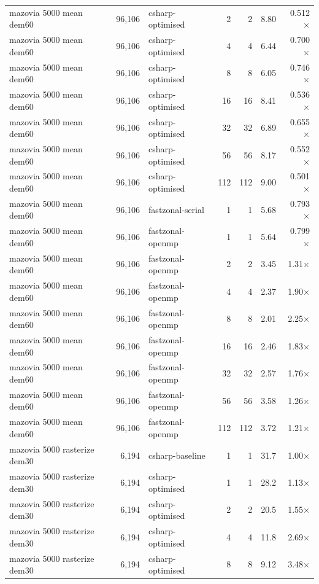 \begin{tabular}{lrlrrrr}
mazovia 5000 mean dem60 & 96,106 & csharp-optimised & 2 & 2 & 8.80 & 0.512$\times$ \\
mazovia 5000 mean dem60 & 96,106 & csharp-optimised & 4 & 4 & 6.44 & 0.700$\times$ \\
mazovia 5000 mean dem60 & 96,106 & csharp-optimised & 8 & 8 & 6.05 & 0.746$\times$ \\
mazovia 5000 mean dem60 & 96,106 & csharp-optimised & 16 & 16 & 8.41 & 0.536$\times$ \\
mazovia 5000 mean dem60 & 96,106 & csharp-optimised & 32 & 32 & 6.89 & 0.655$\times$ \\
mazovia 5000 mean dem60 & 96,106 & csharp-optimised & 56 & 56 & 8.17 & 0.552$\times$ \\
mazovia 5000 mean dem60 & 96,106 & csharp-optimised & 112 & 112 & 9.00 & 0.501$\times$ \\
mazovia 5000 mean dem60 & 96,106 & fastzonal-serial & 1 & 1 & 5.68 & 0.793$\times$ \\
mazovia 5000 mean dem60 & 96,106 & fastzonal-openmp & 1 & 1 & 5.64 & 0.799$\times$ \\
mazovia 5000 mean dem60 & 96,106 & fastzonal-openmp & 2 & 2 & 3.45 & 1.31$\times$ \\
mazovia 5000 mean dem60 & 96,106 & fastzonal-openmp & 4 & 4 & 2.37 & 1.90$\times$ \\
mazovia 5000 mean dem60 & 96,106 & fastzonal-openmp & 8 & 8 & 2.01 & 2.25$\times$ \\
mazovia 5000 mean dem60 & 96,106 & fastzonal-openmp & 16 & 16 & 2.46 & 1.83$\times$ \\
mazovia 5000 mean dem60 & 96,106 & fastzonal-openmp & 32 & 32 & 2.57 & 1.76$\times$ \\
mazovia 5000 mean dem60 & 96,106 & fastzonal-openmp & 56 & 56 & 3.58 & 1.26$\times$ \\
mazovia 5000 mean dem60 & 96,106 & fastzonal-openmp & 112 & 112 & 3.72 & 1.21$\times$ \\
mazovia 5000 rasterize dem30 & 6,194 & csharp-baseline & 1 & 1 & 31.7 & 1.00$\times$ \\
mazovia 5000 rasterize dem30 & 6,194 & csharp-optimised & 1 & 1 & 28.2 & 1.13$\times$ \\
mazovia 5000 rasterize dem30 & 6,194 & csharp-optimised & 2 & 2 & 20.5 & 1.55$\times$ \\
mazovia 5000 rasterize dem30 & 6,194 & csharp-optimised & 4 & 4 & 11.8 & 2.69$\times$ \\
mazovia 5000 rasterize dem30 & 6,194 & csharp-optimised & 8 & 8 & 9.12 & 3.48$\times$ \\

\end{tabular}
